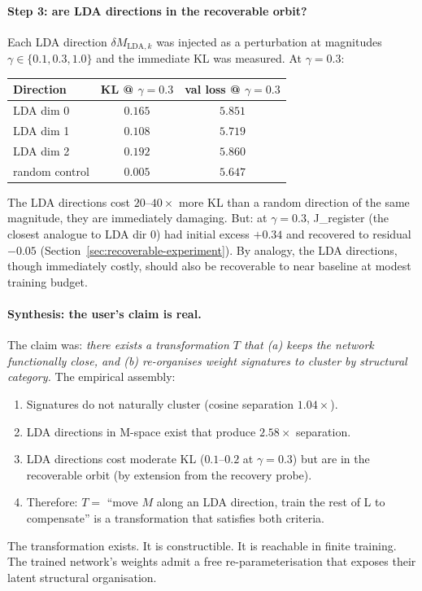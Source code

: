 \documentclass[11pt, a4paper]{article}
\theoremstyle{plain}
\theoremstyle{definition}
\theoremstyle{remark}
\begin{document}
\paragraph{Step 3: are LDA directions in the recoverable orbit?}
Each LDA direction $\delta M_{\text{LDA}, k}$ was injected as a perturbation at magnitudes $\gamma \in \{0.1, 0.3, 1.0\}$ and the immediate KL was measured.
At $\gamma = 0.3$:

\begin{center}
\begin{tabular}{l c c}
\toprule
Direction & KL @ $\gamma=0.3$ & val loss @ $\gamma=0.3$ \\
\midrule
LDA dim 0 & $0.165$ & $5.851$ \\
LDA dim 1 & $0.108$ & $5.719$ \\
LDA dim 2 & $0.192$ & $5.860$ \\
random control & $0.005$ & $5.647$ \\
\bottomrule
\end{tabular}
\end{center}

The LDA directions cost $20$--$40\times$ more KL than a random direction of the same magnitude, they are immediately damaging.
But: at $\gamma = 0.3$, J\_register (the closest analogue to LDA dir 0) had initial excess $+0.34$ and recovered to residual $-0.05$ (Section~\ref{sec:recoverable-experiment}).
By analogy, the LDA directions, though immediately costly, should also be recoverable to near baseline at modest training budget.

\paragraph{Synthesis: the user's claim is real.}
The claim was: \emph{there exists a transformation $T$ that (a) keeps the network functionally close, and (b) re-organises weight signatures to cluster by structural category.}
The empirical assembly:
\begin{enumerate}[nosep]
\item Signatures do not naturally cluster (cosine separation $1.04\times$).
\item LDA directions in M-space exist that produce $2.58\times$ separation.
\item LDA directions cost moderate KL ($0.1$--$0.2$ at $\gamma = 0.3$) but are in the recoverable orbit (by extension from the recovery probe).
\item Therefore: $T = $ ``move $M$ along an LDA direction, train the rest of L to compensate'' is a transformation that satisfies both criteria.
\end{enumerate}
The transformation exists. It is constructible. It is reachable in finite training.
The trained network's weights admit a free re-parameterisation that exposes their latent structural organisation.
\end{document}
